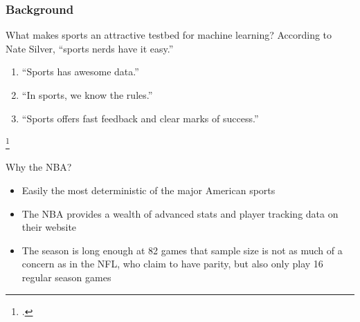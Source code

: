 \documentclass{beamer}
\begin{document}
\begin{frame}
\frametitle{Background}
\begin{block}{What makes sports an attractive testbed for machine learning?}
According to Nate Silver, ``sports nerds have it easy.''\footnotemark
\begin{enumerate}
    \item ``Sports has awesome data.''
    \item ``In sports, we know the rules.''
    \item ``Sports offers fast feedback and clear marks of success.''
\end{enumerate}
\end{block}
\footcitetext{silver-online}
\vspace{-0.5cm}
\begin{block}{Why the NBA?}
\begin{itemize}
    \item Easily the most deterministic of the major American sports
    \item The NBA provides a wealth of advanced stats and player tracking data on their website
    \item The season is long enough at 82 games that sample size is not as much of a concern as in the NFL, who claim to have parity, but also only play 16 regular season games
\end{itemize}
\end{block}
\end{frame}
\end{document}
